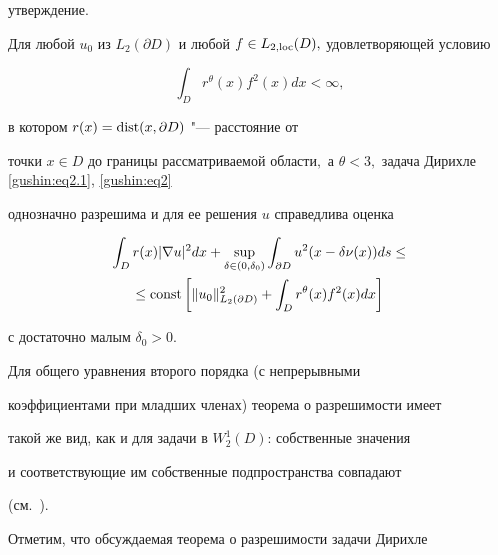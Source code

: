 утверждение.



\smallskip




\begin{theorem}[Михайлова]Для любой $u_0$ из $L_2(\partial

D)$ и любой $f \in L_{2, {\rm loc}}(D),$ удовлетворяющей условию

$$

\int _{D} r^{\theta}(x) f^2(x) dx < \infty,

$$

в котором $r(x) = {\rm dist}(x, \partial D)$ "--- расстояние от

точки $x \in D$ до границы рассматриваемой области$,$ а $\theta <

3,$ задача Дирихле \rm \eqref{gushin:eq2.1}, \eqref{gushin:eq2} \it

однозначно разрешима и для ее решения $u$ справедлива оценка

\begin{multline}

\label{gushin:eq3.2} \int _{D} r(x) |\nabla u|^2 dx +

\sup\limits_{\delta\in (0, \delta_0)} \int _{\partial D}

u^2(x - \delta \nu(x)) ds \leq \\

\leq {\rm const} \left[\Vert u_0 \Vert^2_{L_2(\partial D)} +

\int _{D} r^{\theta}(x) f^2(x) dx \right]

\end{multline}

с достаточно малым $\delta_0 > 0.$

\end{theorem}



\smallskip



Для общего уравнения второго порядка (с непрерывными

коэффициентами при младших членах) теорема о разрешимости имеет

такой же вид, как и для задачи в $W_2^1(D)$: собственные значения

и соответствующие им собственные подпространства совпадают

(см.~\cite{gushin:M76}).



Отметим, что обсуждаемая теорема о разрешимости задачи Дирихле


